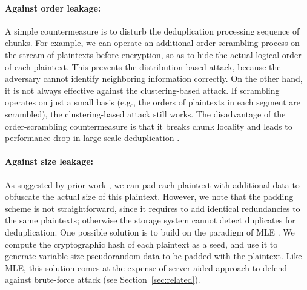 \documentclass[bachelor]{thesis-uestc}
\begin{document}
\paragraph{Against order leakage:}
A simple countermeasure is to disturb the deduplication processing sequence of chunks. For example, we can operate an additional order-scrambling process on the stream of plaintexts before encryption, so as to hide the actual logical order of each plaintext. This prevents the distribution-based attack, because the adversary cannot identify neighboring information correctly. On the other hand, it is not always effective against the clustering-based attack. If scrambling  operates on just a small basis (e.g., the orders of plaintexts in each segment are scrambled), the clustering-based attack still works. 
The disadvantage of the order-scrambling countermeasure is that it breaks chunk locality and leads to performance drop in large-scale deduplication \cite{xia11,zhu08,lillibridge09}. 



\paragraph{Against size leakage:}
As suggested by prior work \cite{ritzdorf16}, we can pad each plaintext with additional data to obfuscate the actual size of this plaintext. However, we note that the padding scheme is not straightforward, since it requires to add identical redundancies to the same plaintexts; otherwise the storage system cannot detect duplicates for deduplication. One possible solution is to build on the paradigm of MLE \cite{bellare13b,bellare13a}. We compute the cryptographic hash of each plaintext as a seed, and use it to generate variable-size pseudorandom data to be padded with the  plaintext. Like MLE, this solution comes at the expense of server-aided approach \cite{bellare13b} to defend against brute-force attack (see Section~\ref{sec:related}).     
\end{document}
